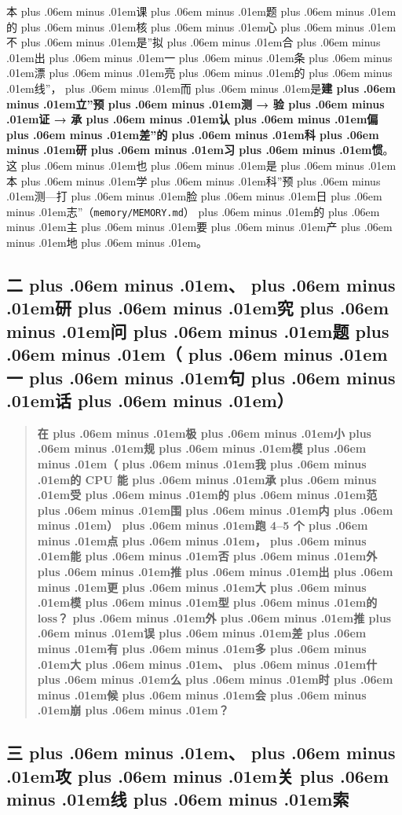 \documentclass[
]{article}
\newcommand{\passthrough}[1]{#1}
\def\zh#1{{\zhfont #1}}
\def\sym#1{{\symfont #1}}
\def\zhglue{\hskip0pt plus .06em minus .01em}
\begin{document}
\zh{本\zhglue 课\zhglue 题\zhglue 的\zhglue 核\zhglue 心\zhglue 不\zhglue 是}''\zh{拟\zhglue 合\zhglue 出\zhglue 一\zhglue 条\zhglue 漂\zhglue 亮\zhglue 的\zhglue 线}''\zh{，\zhglue 而\zhglue 是}\textbf{\zh{建\zhglue 立}''\zh{预\zhglue 测} \sym{→} \zh{验\zhglue 证} \sym{→} \zh{承\zhglue 认\zhglue 偏\zhglue 差}''\zh{的\zhglue 科\zhglue 研\zhglue 习\zhglue 惯}}\zh{。} \zh{这\zhglue 也\zhglue 是\zhglue 本\zhglue 学\zhglue 科}''\zh{预\zhglue 测}---\zh{打\zhglue 脸\zhglue 日\zhglue 志}''\zh{（}\passthrough{\lstinline!memory/MEMORY.md!}\zh{）\zhglue 的\zhglue 主\zhglue 要\zhglue 产\zhglue 地\zhglue 。}

\subsection{\zh{二\zhglue 、\zhglue 研\zhglue 究\zhglue 问\zhglue 题\zhglue （\zhglue 一\zhglue 句\zhglue 话\zhglue ）}}\label{ux4e8cux7814ux7a76ux95eeux9898ux4e00ux53e5ux8bdd}

\begin{quote}
\textbf{\zh{在\zhglue 极\zhglue 小\zhglue 规\zhglue 模\zhglue （\zhglue 我\zhglue 的} CPU \zh{能\zhglue 承\zhglue 受\zhglue 的\zhglue 范\zhglue 围\zhglue 内\zhglue ）\zhglue 跑} 4--5 \zh{个\zhglue 点\zhglue ，\zhglue 能\zhglue 否\zhglue 外\zhglue 推\zhglue 出\zhglue 更\zhglue 大\zhglue 模\zhglue 型\zhglue 的} loss\zh{？\zhglue 外\zhglue 推\zhglue 误\zhglue 差\zhglue 有\zhglue 多\zhglue 大\zhglue 、\zhglue 什\zhglue 么\zhglue 时\zhglue 候\zhglue 会\zhglue 崩\zhglue ？}}
\end{quote}

\subsection{\zh{三\zhglue 、\zhglue 攻\zhglue 关\zhglue 线\zhglue 索}}\label{ux4e09ux653bux5173ux7ebfux7d22}
\end{document}
